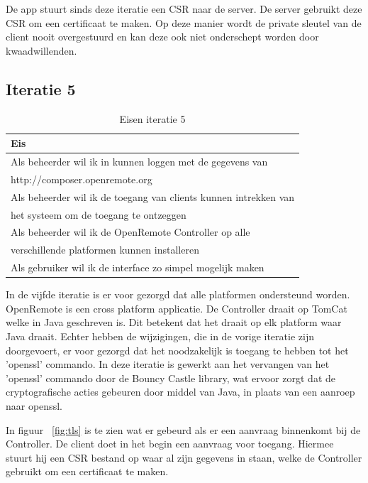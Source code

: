 \documentclass[]{article}
\begin{document}
De app stuurt sinds deze iteratie een CSR naar de server. De server
gebruikt deze CSR om een certificaat te maken. Op deze manier wordt de private
sleutel van de client nooit overgestuurd en kan deze ook niet onderschept
worden door kwaadwillenden.

\subsection{Iteratie 5}
\begin{table}[htpb]
  \caption{Eisen iteratie 5}
  \begin{center}
    \begin{tabular}{|| l ||}\hline
        Eis                                                              \\\hline\hline
        Als beheerder wil ik in kunnen loggen met de gegevens van        \\
        http://composer.openremote.org                                   \\\hline
        Als beheerder wil ik de toegang van clients kunnen intrekken van \\ 
        het systeem om de toegang te ontzeggen                           \\\hline
        Als beheerder wil ik de OpenRemote Controller op alle            \\ 
        verschillende platformen kunnen installeren                      \\\hline
        Als gebruiker wil ik de interface zo simpel mogelijk maken       \\\hline
    \end{tabular}
  \end{center}
\end{table}

In de vijfde iteratie is er voor gezorgd dat alle platformen ondersteund worden.
OpenRemote is een cross platform applicatie. De Controller draait op TomCat
welke in Java geschreven is. Dit betekent dat het draait op elk platform waar
Java draait. Echter hebben de wijzigingen, die in de vorige iteratie zijn
doorgevoert, er voor gezorgd dat het noodzakelijk is toegang te hebben tot
het 'openssl' commando. In deze iteratie is gewerkt aan het vervangen van het
'openssl' commando door de Bouncy Castle library, wat ervoor zorgt dat de
cryptografische acties gebeuren door middel van Java, in plaats van een aanroep
naar openssl. 

In figuur ~\ref{fig:tls} is te zien wat er gebeurd als er een
aanvraag binnenkomt bij de Controller. De client doet in het begin een aanvraag
voor toegang. Hiermee stuurt hij een CSR bestand op waar al zijn gegevens in staan,
welke de Controller gebruikt om een certificaat te maken. 
\end{document}
